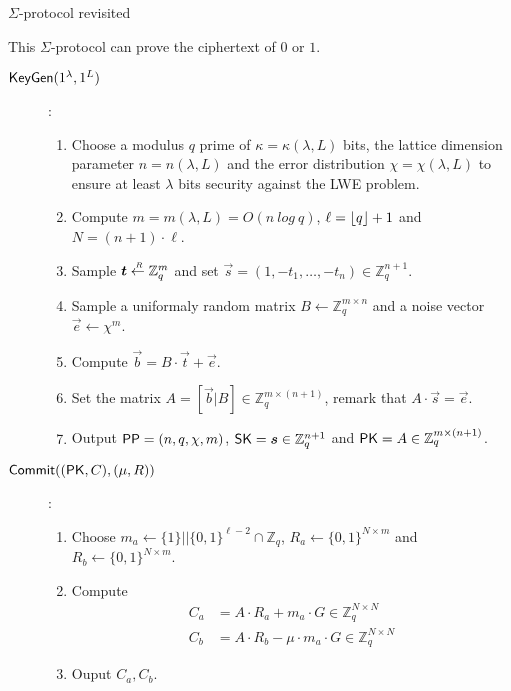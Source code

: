 \begin{subsection}{$\Sigma$-protocol revisited~\cite{DBLP:conf/pkc/ChaidosG15}}
 
    This $\Sigma$-protocol can prove the ciphertext of $0$ or $1$.
 
    \begin{description}
    \item[${\mathsf{KeyGen}}(1^\lambda, 1^L)$]:
      \begin{enumerate}
      \item Choose a modulus $q$ prime of $\kappa = \kappa(\lambda, L)$ bits, the lattice dimension parameter $n = n(\lambda, L)$ and the error distribution $\chi = \chi(\lambda, L)$ to ensure at least $\lambda$ bits security against the LWE problem.
      \item Compute $m = m(\lambda, L) = O(n~log~q)$, $\ell = \lfloor q\rfloor+1$ and $N = (n+1) \cdot \ell$.
      \item Sample $\vec{t} \sample \mathbb{Z}_q^m$ and set $\vec{s} = (1, -t_1, \dots, -t_n) \in \mathbb{Z}_q^{n+1}$.
      \item Sample a uniformaly random matrix $B \gets \mathbb{Z}_q^{m \times n}$ and a noise vector $\vec{e} \gets \chi^m$.
      \item Compute $\vec{b} = B \cdot \vec{t} + \vec{e}$.
      \item Set the matrix $A = [\vec{b}|B] \in \mathbb{Z}_q^{m \times (n+1)}$, remark that $A \cdot \vec{s} = \vec{e}$.
      \item Output ${\mathsf{PP}} = (n, q, \chi, m)$, $\SK = \vec{s} \in \mathbb{Z}_q^{n+1}$ and $\mathsf{PK} = A \in \mathbb{Z}_q^{m \times (n+1)}$.
      \end{enumerate}
    \item[${\mathsf{Commit}}((\mathsf{PK}, C), (\mu, R))$]:
      \begin{enumerate}
      \item Choose $m_a \gets \{1\}||\{0,1\}^{\ell-2} \cap \mathbb{Z}_q$, $R_a \gets \{0,1\}^{N \times m}$ and $R_b \gets \{0,1\}^{N \times m}$.
      \item Compute
        \begin{align*}
          C_a &= A\cdot R_a + m_a \cdot G \in \mathbb{Z}_q^{N \times N}\\
          C_b &= A\cdot R_b - \mu \cdot m_a \cdot G \in \mathbb{Z}_q^{N \times N}          
        \end{align*}
      \item Ouput $C_a, C_b$.
      \end{enumerate}
 

\end{description}
\end{subsection}
